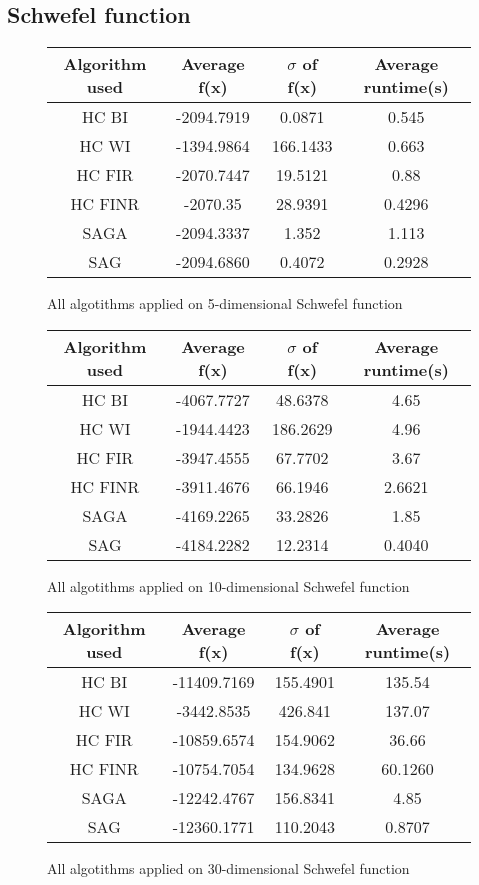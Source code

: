\documentclass{article}
\begin{document}
\subsection{Schwefel function}

\begin{figure}[H]
	\begin{tabular}{|c||c|c|c|} \hline
		Algorithm used & Average f(x) & $\sigma$ of f(x) & Average runtime(s) \\ \hline \hline
		HC BI & -2094.7919 & 0.0871 & 0.545 \\ \hline
		HC WI & -1394.9864 & 166.1433 & 0.663 \\ \hline
		HC FIR & -2070.7447 & 19.5121 & 0.88 \\ \hline
		HC FINR & -2070.35 & 28.9391 & 0.4296 \\ \hline
		SAGA & -2094.3337 & 1.352 & 1.113 \\ \hline
		SAG & -2094.6860 & 0.4072 & 0.2928 \\ \hline
\end{tabular}
\caption{All algotithms applied on 5-dimensional Schwefel function}
\end{figure}

\begin{figure}[H]
	\begin{tabular}{|c||c|c|c|} \hline
		Algorithm used & Average f(x) & $\sigma$ of f(x) & Average runtime(s) \\ \hline \hline
		HC BI & -4067.7727 & 48.6378 & 4.65 \\ \hline
		HC WI & -1944.4423 & 186.2629 & 4.96 \\ \hline
		HC FIR & -3947.4555 & 67.7702 & 3.67 \\ \hline
		HC FINR & -3911.4676 & 66.1946 & 2.6621 \\ \hline
		SAGA & -4169.2265 & 33.2826 & 1.85 \\ \hline
		SAG & -4184.2282 & 12.2314 & 0.4040 \\ \hline
\end{tabular}
\caption{All algotithms applied on 10-dimensional Schwefel function}
\end{figure}

\begin{figure}[H]
	\begin{tabular}{|c||c|c|c|} \hline
		Algorithm used & Average f(x) & $\sigma$ of f(x) & Average runtime(s) \\ \hline \hline
		HC BI & -11409.7169 & 155.4901 & 135.54 \\ \hline
		HC WI & -3442.8535 & 426.841 & 137.07 \\ \hline
		HC FIR & -10859.6574 & 154.9062 & 36.66 \\ \hline
		HC FINR & -10754.7054 & 134.9628 & 60.1260 \\ \hline
		SAGA & -12242.4767 & 156.8341 & 4.85 \\ \hline
		SAG & -12360.1771 & 110.2043 & 0.8707 \\ \hline
\end{tabular}
\caption{All algotithms applied on 30-dimensional Schwefel function}
\end{figure}
\end{document}
